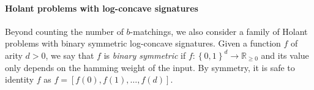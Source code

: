 \documentclass[11pt]{article}
\newtheorem{theorem}{Theorem}
\newcommand{\abs}[1]{\left\vert#1\right\vert}
\newcommand{\set}[1]{\left\{#1\right\}}
\def\poly{\mathrm{poly}}
\newcommand{\wh}[1]{\widehat{#1}}
\begin{document}


\paragraph{Holant problems with log-concave signatures}

Beyond counting the number of $b$-matchings, we also consider a family of Holant problems with binary symmetric log-concave signatures. Given a function $f$ of arity $d > 0$, we say that $f$ is \emph{binary symmetric} if $f : \set{0, 1}^d \to \mathbb R_{\ge 0}$ and its value only depends on the hamming weight of the input. By symmetry, it is safe to identity $f$ as $f = [f(0), f(1), \ldots, f(d)]$.
\end{document}

